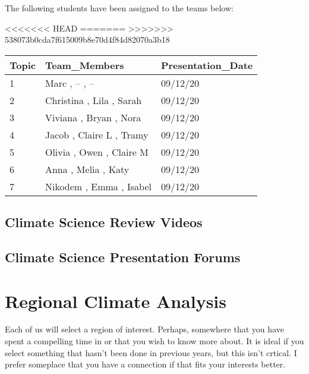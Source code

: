 \documentclass{article}\usepackage[]{graphicx}\usepackage[]{color}
\begin{document}
{\color{red}The following students have been assigned to the teams below:

<<<<<<< HEAD
=======
>>>>>>> 538073b0cda7f615009b8e70d4f84d82070a3b18
\begin{table}[ht]
\centering
\begin{tabular}{lll}
  \hline
Topic & Team\_Members & Presentation\_Date \\ 
  \hline
1 & Marc ,  -- ,  -- & 09/12/20 \\ 
  2 & Christina ,  Lila ,  Sarah & 09/12/20 \\ 
  3 & Viviana ,  Bryan ,  Nora & 09/12/20 \\ 
  4 & Jacob ,  Claire L ,  Tramy & 09/12/20 \\ 
  5 & Olivia ,  Owen ,  Claire M & 09/12/20 \\ 
  6 & Anna ,  Melia ,  Katy & 09/12/20 \\ 
  7 & Nikodem ,  Emma ,  Isabel & 09/12/20 \\ 
   \hline
\end{tabular}
\end{table}

}
\subsection{Climate Science Review {\color{red}Videos}}




%

\subsection{Climate Science Presentation Forums}



\section{Regional Climate Analysis}

Each of us will select a region of interest. Perhaps, somewhere that you have spent a compelling time in or that you wish to know more about. It is ideal if you select something that hasn't been done in previous years, but this isn't crtical. I prefer someplace that you have a connection if that fits your interests better. %
\end{document}
